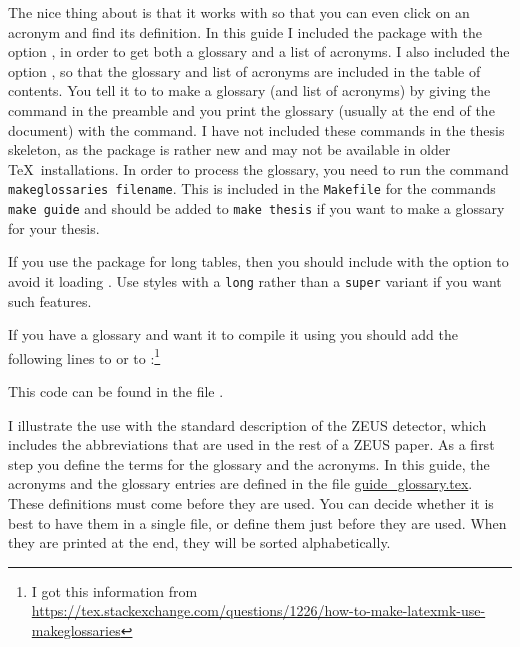 The nice thing about  is that it works with
 so that you can even click on an acronym and find
its definition. In this guide I included the package with the option
, in order to get both a glossary and a list of
acronyms. I also included the option , so that the
glossary and list of acronyms are included in the table of
contents. You tell it to to make a glossary (and list of acronyms) by
giving the command  in the preamble and you
print the glossary (usually at the end of the document) with the
 command. I have not included these commands in
the thesis skeleton, as the  package is rather new
and may not be available in older \TeX\ installations. In order to
process the glossary, you need to run the command
\texttt{makeglossaries filename}. This is included in the
\texttt{Makefile} for the commands \texttt{make guide}
and should be added to \texttt{make thesis}
if you want to make a glossary for your thesis.

If you use the package  for long tables,
then you should include  with the option 
to avoid it loading .
Use styles with a \texttt{long} rather than a \texttt{super} variant if you want such features.

If you have a glossary and want it to compile it using 
you should add the following
lines to  or to :\footnote{%
I got this information from \url{https://tex.stackexchange.com/questions/1226/how-to-make-latexmk-use-makeglossaries}}
\noindent This code can be found in the file .

I illustrate the use with the standard description of the ZEUS
detector, which includes the abbreviations that are used in the rest
of a ZEUS paper.  As a first step you define the terms for the
glossary and the acronyms.  In this guide, the acronyms and the
glossary entries are defined in the file
\url{guide_glossary.tex}. These definitions must come before
they are used. You can decide whether it is best to have them in a
single file, or define them just before they are used. When they are
printed at the end, they will be sorted alphabetically.

